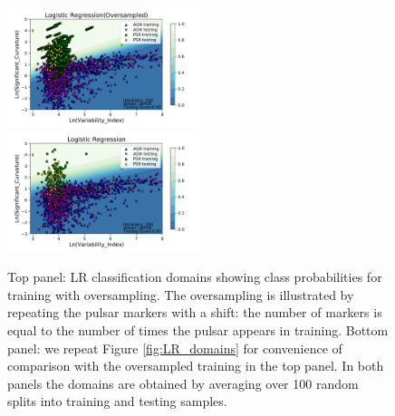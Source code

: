 \begin{figure}[h]
\includegraphics[width=0.5\textwidth]{plots/classification_domains/lr_200_lbfgs_oversample.pdf}
\includegraphics[width=0.5\textwidth]{plots/classification_domains/lr_200_lbfgs.pdf}
\caption{Top panel: LR classification domains showing class probabilities for training with oversampling.
The oversampling is illustrated by repeating the pulsar markers with a shift: the number of markers is equal to the number of times the pulsar appears in training.
Bottom panel: we repeat Figure \ref{fig:LR_domains} for convenience of comparison with the oversampled training in the top panel.
In both panels the domains are obtained by averaging over 100 random splits into training and testing samples.
}  
\label{fig:LR_domains_O}
\end{figure}
